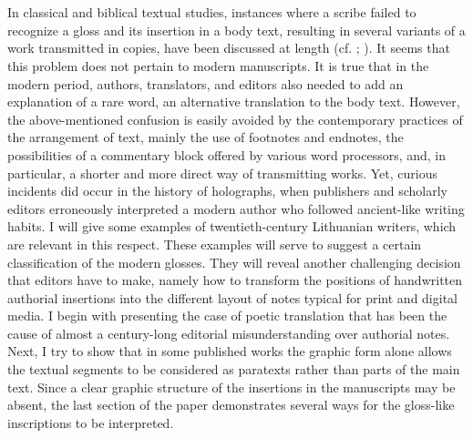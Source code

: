 \documentclass{article}
\begin{document}
\section*{} 
In classical and biblical textual studies, instances where a scribe failed to recognize a gloss and its insertion in a body text, resulting in several variants of a work transmitted in copies, have been discussed at length (cf. \citealt[17, 31--32]{renehan_greek_1969}; \citealt[16--17]{walker_interpolations_2001}). It seems that this problem does not pertain to modern
manuscripts. It is true that in the modern period, authors, translators,
and editors also needed to add an explanation of a rare word, an
alternative translation to the body text. However, the above-mentioned confusion is easily avoided by the contemporary
practices of the arrangement of text, mainly the use of footnotes and endnotes, the
possibilities of a commentary block offered by various word processors, and,
in particular, a shorter and more direct way of transmitting works. Yet, curious incidents
did occur in the history of holographs, when publishers and scholarly editors erroneously interpreted a modern author who
followed \label{qtSubacius}ancient-like writing habits. I will give some examples of
twentieth-century Lithuanian writers, which are relevant in this
respect. These examples will serve to suggest a certain classification
of the modern glosses. They will reveal another challenging decision that editors have to
make, namely how to transform the positions of
handwritten authorial insertions into the different layout of notes typical for print and digital media. I begin with presenting the
case of poetic translation that has been the cause of almost a
century-long editorial misunderstanding over authorial notes. Next, I
try to show that in some published works the graphic form alone allows
the textual segments to be considered as paratexts rather than parts of
the main text. Since a clear graphic structure of the insertions in the
manuscripts may be absent, the last section of the paper demonstrates
several ways for the gloss-like inscriptions to be interpreted.
\end{document}
